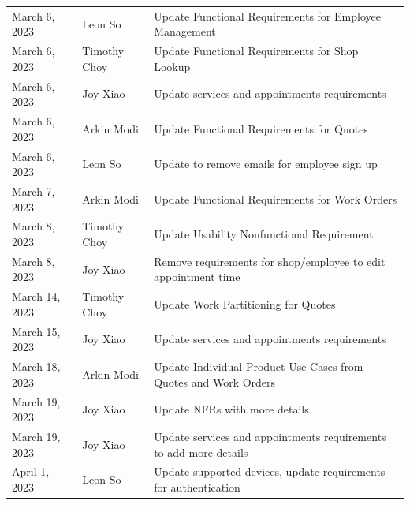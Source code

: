 \documentclass[12pt]{article}
\begin{document}
\begin{longtable}{p{} p{} p{}}
	March 6, 2023      & Leon So               & Update Functional Requirements for Employee Management                             \\
	March 6, 2023      & Timothy Choy          & Update Functional Requirements for Shop Lookup                                     \\
	March 6, 2023      & Joy Xiao              & Update services and appointments requirements                                      \\
	March 6, 2023      & Arkin Modi            & Update Functional Requirements for Quotes                                          \\
	March 6, 2023      & Leon So               & Update to remove emails for employee sign up                                       \\
	March 7, 2023      & Arkin Modi            & Update Functional Requirements for Work Orders                                     \\
	March 8, 2023      & Timothy Choy          & Update Usability Nonfunctional Requirement                                         \\
	March 8, 2023      & Joy Xiao              & Remove requirements for shop/employee to edit appointment time                     \\
	March 14, 2023     & Timothy Choy          & Update Work Partitioning for Quotes                                                \\
	March 15, 2023     & Joy Xiao              & Update services and appointments requirements                                      \\
	March 18, 2023     & Arkin Modi            & Update Individual Product Use Cases from Quotes and Work Orders                    \\
	March 19, 2023     & Joy Xiao              & Update NFRs with more details                                                      \\
	March 19, 2023     & Joy Xiao              & Update services and appointments requirements to add more details                  \\
	April 1, 2023      & Leon So               & Update supported devices, update requirements for authentication                   \\
	\bottomrule
\end{longtable}

\newpage

\end{document}

